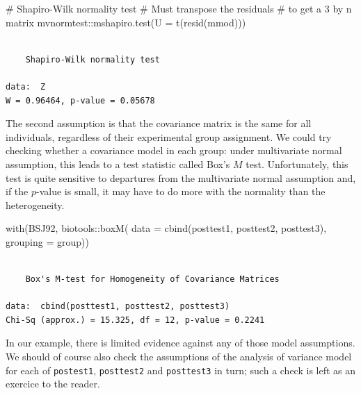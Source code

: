 \documentclass[
  11pt,
  letterpaper,
]{scrbook}
\newenvironment{Shaded}{\begin{snugshade}}{\end{snugshade}}
\newcommand{\AttributeTok}[1]{\textcolor[rgb]{0.40,0.45,0.13}{#1}}
\newcommand{\CommentTok}[1]{\textcolor[rgb]{0.37,0.37,0.37}{#1}}
\newcommand{\FunctionTok}[1]{\textcolor[rgb]{0.28,0.35,0.67}{#1}}
\newcommand{\NormalTok}[1]{\textcolor[rgb]{0.00,0.23,0.31}{#1}}
\newcommand{\SpecialCharTok}[1]{\textcolor[rgb]{0.37,0.37,0.37}{#1}}
\theoremstyle{definition}
\theoremstyle{definition}
\theoremstyle{remark}
\begin{document}
\begin{Shaded}
\begin{Highlighting}[]
\CommentTok{\# Shapiro{-}Wilk normality test}
\CommentTok{\# Must transpose the residuals }
\CommentTok{\# to get a 3 by n matrix}
\NormalTok{mvnormtest}\SpecialCharTok{::}\FunctionTok{mshapiro.test}\NormalTok{(}\AttributeTok{U =} \FunctionTok{t}\NormalTok{(}\FunctionTok{resid}\NormalTok{(mmod)))}
\end{Highlighting}
\end{Shaded}

\begin{verbatim}

    Shapiro-Wilk normality test

data:  Z
W = 0.96464, p-value = 0.05678
\end{verbatim}

The second assumption is that the covariance matrix is the same for all
individuals, regardless of their experimental group assignment. We could
try checking whether a covariance model in each group: under
multivariate normal assumption, this leads to a test statistic called
Box's \(M\) test. Unfortunately, this test is quite sensitive to
departures from the multivariate normal assumption and, if the
\(p\)-value is small, it may have to do more with the normality than the
heterogeneity.

\begin{Shaded}
\begin{Highlighting}[]
\FunctionTok{with}\NormalTok{(BSJ92, }
\NormalTok{     biotools}\SpecialCharTok{::}\FunctionTok{boxM}\NormalTok{(}
       \AttributeTok{data =} \FunctionTok{cbind}\NormalTok{(posttest1, posttest2, posttest3),}
       \AttributeTok{grouping =}\NormalTok{ group))}
\end{Highlighting}
\end{Shaded}

\begin{verbatim}

    Box's M-test for Homogeneity of Covariance Matrices

data:  cbind(posttest1, posttest2, posttest3)
Chi-Sq (approx.) = 15.325, df = 12, p-value = 0.2241
\end{verbatim}

In our example, there is limited evidence against any of those model
assumptions. We should of course also check the assumptions of the
analysis of variance model for each of \texttt{postest1},
\texttt{posttest2} and \texttt{posttest3} in turn; such a check is left
as an exercice to the reader.
\end{document}

